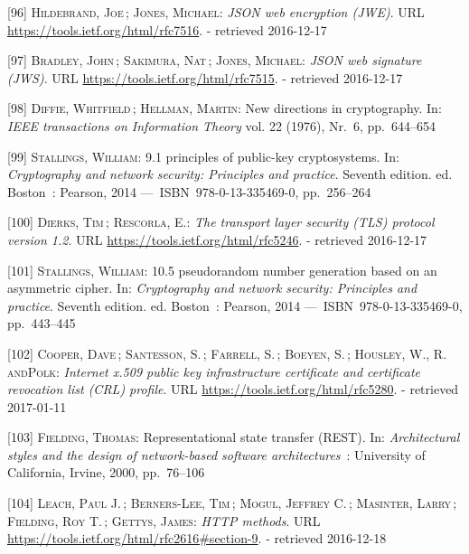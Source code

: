 \documentclass[12pt,english,a4paper,titlepage,cleardoublepage=empty,dottedtoc]{report}
\begin{document}
\hypertarget{ref-web_spec_json-web-encryption}{}
{[}96{]} \textsc{Hildebrand, Joe}\,; \textsc{Jones, Michael}: \emph{JSON
web encryption (JWE)}. URL \url{https://tools.ietf.org/html/rfc7516}. -
retrieved 2016-12-17

\hypertarget{ref-web_spec_json-web-signature}{}
{[}97{]} \textsc{Bradley, John}\,; \textsc{Sakimura, Nat}\,;
\textsc{Jones, Michael}: \emph{JSON web signature (JWS)}. URL
\url{https://tools.ietf.org/html/rfc7515}. - retrieved 2016-12-17

\hypertarget{ref-paper_1976_d-h-key-exchange}{}
{[}98{]} \textsc{Diffie, Whitfield}\,; \textsc{Hellman, Martin}: New
directions in cryptography. In: \emph{IEEE transactions on Information
Theory} vol. 22 (1976), Nr.~6, pp.~644--654

\hypertarget{ref-book_2014_chapter-9-1-public-key-crypto}{}
{[}99{]} \textsc{Stallings, William}: 9.1 principles of public-key
cryptosystems. In: \emph{Cryptography and network security: Principles
and practice}. Seventh edition. ed. Boston~: Pearson, 2014
---~ISBN~978-0-13-335469-0, pp.~256--264

\hypertarget{ref-web_spec_tls}{}
{[}100{]} \textsc{Dierks, Tim}\,; \textsc{Rescorla, E.}: \emph{The
transport layer security (TLS) protocol version 1.2}. URL
\url{https://tools.ietf.org/html/rfc5246}. - retrieved 2016-12-17

\hypertarget{ref-book_2014_chapter-14-5-pki}{}
{[}101{]} \textsc{Stallings, William}: 10.5 pseudorandom number
generation based on an asymmetric cipher. In: \emph{Cryptography and
network security: Principles and practice}. Seventh edition. ed.
Boston~: Pearson, 2014 ---~ISBN~978-0-13-335469-0, pp.~443--445

\hypertarget{ref-web_spec_x509}{}
{[}102{]} \textsc{Cooper, Dave}\,; \textsc{Santesson, S.}\,;
\textsc{Farrell, S.}\,; \textsc{Boeyen, S.}\,; \textsc{Housley, W.,
\textnormal{R. andPolk}}: \emph{Internet x.509 public key infrastructure
certificate and certificate revocation list (CRL) profile}. URL
\url{https://tools.ietf.org/html/rfc5280}. - retrieved 2017-01-11

\hypertarget{ref-web_spec_rest}{}
{[}103{]} \textsc{Fielding, Thomas}: Representational state transfer
(REST). In: \emph{Architectural styles and the design of network-based
software architectures}~: University of California, Irvine, 2000,
pp.~76--106

\hypertarget{ref-web_spec_http-methods}{}
{[}104{]} \textsc{Leach, Paul J.}\,; \textsc{Berners-Lee, Tim}\,;
\textsc{Mogul, Jeffrey C.}\,; \textsc{Masinter, Larry}\,;
\textsc{Fielding, Roy T.}\,; \textsc{Gettys, James}: \emph{HTTP
methods}. URL \url{https://tools.ietf.org/html/rfc2616\#section-9}. -
retrieved 2016-12-18
\end{document}
